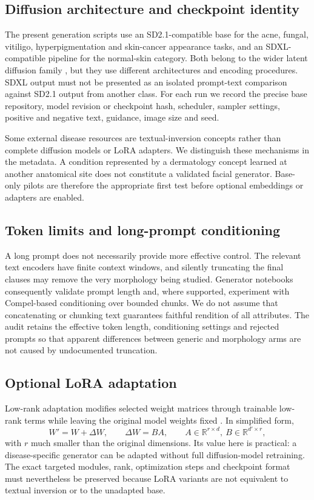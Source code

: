 \subsection{Diffusion architecture and checkpoint identity}
The present generation scripts use an SD2.1-compatible base for the acne, fungal, vitiligo, hyperpigmentation and skin-cancer appearance tasks, and an SDXL-compatible pipeline for the normal-skin category. Both belong to the wider latent diffusion family \citep{rombach2022latent}, but they use different architectures and encoding procedures. SDXL output must not be presented as an isolated prompt-text comparison against SD2.1 output from another class. For each run we record the precise base repository, model revision or checkpoint hash, scheduler, sampler settings, positive and negative text, guidance, image size and seed.

Some external disease resources are textual-inversion concepts rather than complete diffusion models or LoRA adapters. We distinguish these mechanisms in the metadata. A condition represented by a dermatology concept learned at another anatomical site does not constitute a validated facial generator. Base-only pilots are therefore the appropriate first test before optional embeddings or adapters are enabled.

\subsection{Token limits and long-prompt conditioning}
A long prompt does not necessarily provide more effective control. The relevant text encoders have finite context windows, and silently truncating the final clauses may remove the very morphology being studied. Generator notebooks consequently validate prompt length and, where supported, experiment with Compel-based conditioning over bounded chunks. We do not assume that concatenating or chunking text guarantees faithful rendition of all attributes. The audit retains the effective token length, conditioning settings and rejected prompts so that apparent differences between generic and morphology arms are not caused by undocumented truncation.

\subsection{Optional LoRA adaptation}
Low-rank adaptation modifies selected weight matrices through trainable low-rank terms while leaving the original model weights fixed \citep{hu2022lora}. In simplified form,
\begin{equation}
W'=W+\Delta W,\qquad \Delta W=BA,\qquad
A\in\mathbb{R}^{r\times d},\ B\in\mathbb{R}^{d'\times r},
\end{equation}
with $r$ much smaller than the original dimensions. Its value here is practical: a disease-specific generator can be adapted without full diffusion-model retraining. The exact targeted modules, rank, optimization steps and checkpoint format must nevertheless be preserved because LoRA variants are not equivalent to textual inversion or to the unadapted base.


